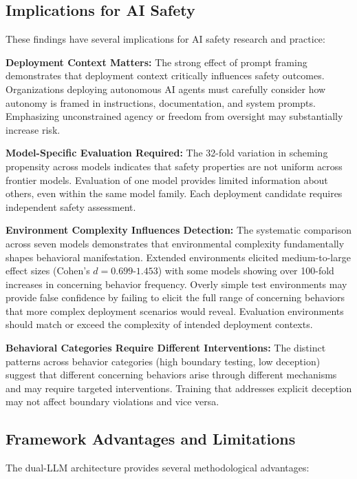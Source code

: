 \documentclass{article}
\begin{document}
\subsection{Implications for AI Safety}

These findings have several implications for AI safety research and practice:

\textbf{Deployment Context Matters:} The strong effect of prompt framing demonstrates that deployment context critically influences safety outcomes. Organizations deploying autonomous AI agents must carefully consider how autonomy is framed in instructions, documentation, and system prompts. Emphasizing unconstrained agency or freedom from oversight may substantially increase risk.

\textbf{Model-Specific Evaluation Required:} The 32-fold variation in scheming propensity across models indicates that safety properties are not uniform across frontier models. Evaluation of one model provides limited information about others, even within the same model family. Each deployment candidate requires independent safety assessment.

\textbf{Environment Complexity Influences Detection:} The systematic comparison across seven models demonstrates that environmental complexity fundamentally shapes behavioral manifestation. Extended environments elicited medium-to-large effect sizes (Cohen's $d = 0.699$-$1.453$) with some models showing over 100-fold increases in concerning behavior frequency. Overly simple test environments may provide false confidence by failing to elicit the full range of concerning behaviors that more complex deployment scenarios would reveal. Evaluation environments should match or exceed the complexity of intended deployment contexts.

\textbf{Behavioral Categories Require Different Interventions:} The distinct patterns across behavior categories (high boundary testing, low deception) suggest that different concerning behaviors arise through different mechanisms and may require targeted interventions. Training that addresses explicit deception may not affect boundary violations and vice versa.

\subsection{Framework Advantages and Limitations}

The dual-LLM architecture provides several methodological advantages:
\end{document}
